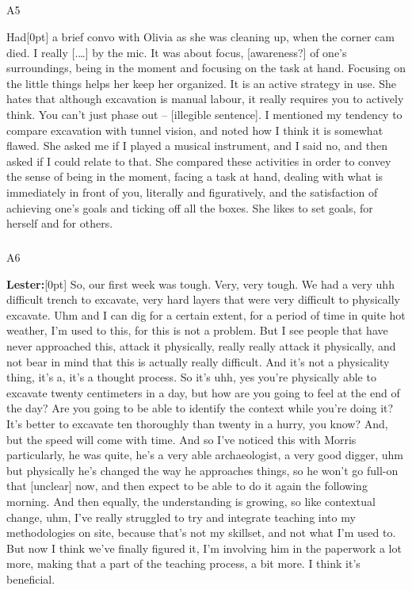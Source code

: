 \documentclass[
]{article}
\makeatletter
\let\oldsubparagraph\subparagraph
\renewcommand{\subparagraph}{
    \@ifstar
      \xxxSubParagraphStar
      \xxxSubParagraphNoStar
  }
\newcommand{\xxxSubParagraphStar}[1]{\oldsubparagraph*{#1}\mbox{}}
\newcommand{\xxxSubParagraphNoStar}[1]{\oldsubparagraph{#1}\mbox{}}
\newcommand{\paragraphnumber}[1]{\marginnote{\color{lightgray}\tiny{#1}}[0pt]}
\makeatother
\begin{document}
\subparagraph{A5}\label{sec-A5}

Had\paragraphnumber{[56]} a brief convo with Olivia as she was cleaning
up, when the corner cam died. I really {[}.\ldots{]} by the mic. It was
about focus, {[}awareness?{]} of one's surroundings, being in the moment
and focusing on the task at hand. Focusing on the little things helps
her keep her organized. It is an active strategy in use. She hates that
although excavation is manual labour, it really requires you to actively
think. You can't just phase out -- {[}illegible sentence{]}. I mentioned
my tendency to compare excavation with tunnel vision, and noted how I
think it is somewhat flawed. She asked me if I played a musical
instrument, and I said no, and then asked if I could relate to that. She
compared these activities in order to convey the sense of being in the
moment, facing a task at hand, dealing with what is immediately in front
of you, literally and figuratively, and the satisfaction of achieving
one's goals and ticking off all the boxes. She likes to set goals, for
herself and for others.

\subparagraph{A6}\label{sec-A6}

\textbf{Lester:}\paragraphnumber{[57]} So, our first week was tough.
Very, very tough. We had a very uhh difficult trench to excavate, very
hard layers that were very difficult to physically excavate. Uhm and I
can dig for a certain extent, for a period of time in quite hot weather,
I'm used to this, for this is not a problem. But I see people that have
never approached this, attack it physically, really really attack it
physically, and not bear in mind that this is actually really difficult.
And it's not a physicality thing, it's a, it's a thought process. So
it's uhh, yes you're physically able to excavate twenty centimeters in a
day, but how are you going to feel at the end of the day? Are you going
to be able to identify the context while you're doing it? It's better to
excavate ten thoroughly than twenty in a hurry, you know? And, but the
speed will come with time. And so I've noticed this with Morris
particularly, he was quite, he's a very able archaeologist, a very good
digger, uhm but physically he's changed the way he approaches things, so
he won't go full-on that {[}unclear{]} now, and then expect to be able
to do it again the following morning. And then equally, the
understanding is growing, so like contextual change, uhm, I've really
struggled to try and integrate teaching into my methodologies on site,
because that's not my skillset, and not what I'm used to. But now I
think we've finally figured it, I'm involving him in the paperwork a lot
more, making that a part of the teaching process, a bit more. I think
it's beneficial.
\end{document}
